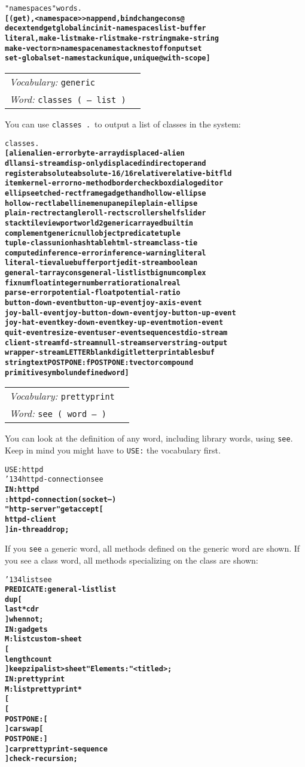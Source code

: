 \documentclass{book}
\newcommand{\bs}{\char'134}
\newcommand{\vocabulary}[1]{\emph{Vocabulary:} \texttt{#1}&\\}
\newcommand{\ordinaryword}[2]{\index{\texttt{#1}}\emph{Word:} \texttt{#2}&\\}
\newcommand{\wordtable}[1]{


\begin{tabularx}{12cm}{lX}
\hline
#1
\hline
\end{tabularx}

}
\begin{document}
\begin{alltt}
  "namespaces" words .
\textbf{[ (get) , <namespace> >n append, bind change cons@
dec extend get global inc init-namespaces list-buffer
literal, make-list make-rlist make-rstring make-string
make-vector n> namespace namestack nest off on put set
set-global set-namestack unique, unique@ with-scope ]}
\end{alltt}

\wordtable{
\vocabulary{generic}
\ordinaryword{classes}{classes ( -- list )}
}
You can use \texttt{classes .}~to output a list of classes in the system:

\begin{alltt}
  classes .
\textbf{[ alien alien-error byte-array displaced-alien
dll ansi-stream disp-only displaced indirect operand
register absolute absolute-16/16 relative relative-bitfld
item kernel-error no-method border checkbox dialog editor
ellipse etched-rect frame gadget hand hollow-ellipse
hollow-rect label line menu pane pile plain-ellipse
plain-rect rectangle roll-rect scroller shelf slider
stack tile viewport world 2generic arrayed builtin
complement generic null object predicate tuple
tuple-class union hashtable html-stream class-tie
computed inference-error inference-warning literal
literal-tie value buffer port jedit-stream boolean
general-t array cons general-list list bignum complex
fixnum float integer number ratio rational real
parse-error potential-float potential-ratio
button-down-event button-up-event joy-axis-event
joy-ball-event joy-button-down-event joy-button-up-event
joy-hat-event key-down-event key-up-event motion-event
quit-event resize-event user-event sequence stdio-stream
client-stream fd-stream null-stream server string-output
wrapper-stream LETTER blank digit letter printable sbuf
string text POSTPONE: f POSTPONE: t vector compound
primitive symbol undefined word ]}
\end{alltt}

\wordtable{
\vocabulary{prettyprint}
\ordinaryword{see}{see ( word -- )}
}
You can look at the definition of any word, including library words, using \texttt{see}. Keep in mind you might have to \texttt{USE:} the vocabulary first.

\begin{alltt}
  USE: httpd
  \bs httpd-connection see
\textbf{IN: httpd
: httpd-connection ( socket -- )
    "http-server" get accept [
        httpd-client
    ] in-thread drop ;}
\end{alltt}

If you \texttt{see} a generic word, all methods defined on the generic word are shown. If you see a class word, all methods specializing on the class are shown:
\begin{alltt}
  \bs list see
\textbf{PREDICATE: general-list list
    dup [
        last* cdr
    ] when not ;
IN: gadgets
M: list custom-sheet
    [
        length count
    ] keep zip alist>sheet "Elements:" <titled> ;
IN: prettyprint
M: list prettyprint*
    [
        [
            POSTPONE: [
        ] car swap [
            POSTPONE: ]
        ] car prettyprint-sequence
    ] check-recursion ;}
\end{alltt}
\end{document}
